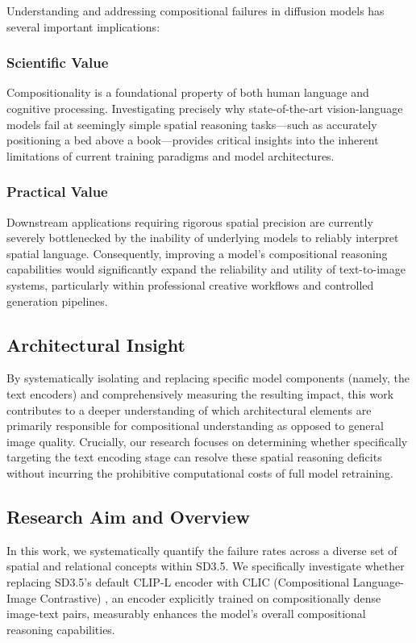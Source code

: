 Understanding and addressing compositional failures in diffusion models has several important implications:

\subsubsection{Scientific Value}
Compositionality is a foundational property of both human language and cognitive processing. Investigating precisely why state-of-the-art vision-language models fail at seemingly simple spatial reasoning tasks—such as accurately positioning a bed above a book—provides critical insights into the inherent limitations of current training paradigms and model architectures.

\subsubsection{Practical Value}
Downstream applications requiring rigorous spatial precision \citep{ruiz2023dreamboothfinetuningtexttoimage, tian2023stablerepsyntheticimagestexttoimage, hammoud2024synthclipreadyfullysynthetic, voetman2023bigdatamythusing} are currently severely bottlenecked by the inability of underlying models to reliably interpret spatial language. Consequently, improving a model's compositional reasoning capabilities would significantly expand the reliability and utility of text-to-image systems, particularly within professional creative workflows and controlled generation pipelines.


\subsection{Architectural Insight}
By systematically isolating and replacing specific model components (namely, the text encoders) and comprehensively measuring the resulting impact, this work contributes to a deeper understanding of which architectural elements are primarily responsible for compositional understanding as opposed to general image quality. Crucially, our research focuses on determining whether specifically targeting the text encoding stage can resolve these spatial reasoning deficits without incurring the prohibitive computational costs of full model retraining.


\subsection{Research Aim and Overview}
In this work, we systematically quantify the failure rates across a diverse set of spatial and relational concepts within SD3.5. We specifically investigate whether replacing SD3.5's default CLIP-L encoder with CLIC (Compositional Language-Image Contrastive) \citep{peleg2025advancingcompositionalawarenessclip}, an encoder explicitly trained on compositionally dense image-text pairs, measurably enhances the model's overall compositional reasoning capabilities.

